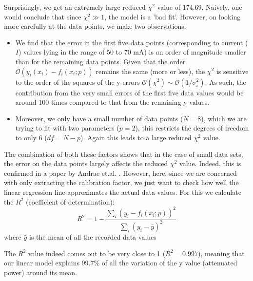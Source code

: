 Surprisingly, we get an extremely large reduced $\chi^{2}$ value of 174.69. Naively, one would conclude that since $\chi^{2}\gg 1$, the model is a 'bad fit'. However, on looking more carefully at the data points, we make two observations:
\begin{itemize}
\item We find that the error in the first five data points (corresponding to current ($I$) values lying in the range of 50 to 70 mA) is an order of magnitude smaller than for the remaining data points. Given that the order $\mathcal{O}(y_{i}(x_{i})-f_{i}(x_{i};p))$ remains the same (more or less), the $\chi^{2}$ is sensitive to the order of the squares of the y-errors $\mathcal{O}(\chi^{2})\sim \mathcal{O}\left(1/\sigma_{i}^{2}\right)$. As such, the contribution from the very small errors of the first five data values would be around 100 times compared to that from the remaining y values.
\item Moreover, we only have a small number of data points ($N=8$), which we are trying to fit with two parameters ($p=2$), this restricts the degrees of freedom to only 6 ($df=N-p$). Again this leads to a large reduced $\chi^{2}$ value.
\end{itemize}
The combination of both these factors shows that in the case of small data sets, the error on the data points largely affects the reduced $\chi^{2}$ value. Indeed, this is confirmed in a paper by Andrae et.al. \cite{https://doi.org/10.48550/arxiv.1012.3754}. However, here, since we are concerned with only extracting the calibration factor, we just want to check how well the linear regression line approximates the actual data values. For this we calculate the $R^{2}$ (coefficient of determination): 
\begin{equation}
R^{2}=1-\displaystyle\dfrac{\sum_{i}\left(y_{i}-f_{i}(x_{i};p)\right)^{2}}{\sum_{i}\left(y_{i}-\bar{y}\right)^{2}}
\end{equation}
where $\bar{y}$ is the mean of all the recorded data values

The $R^{2}$ value indeed comes out to be very close to 1 ($R^{2}=0.997$), meaning that our linear model explains 99.7\% of all the variation of the y value (attenuated power) around its mean.

